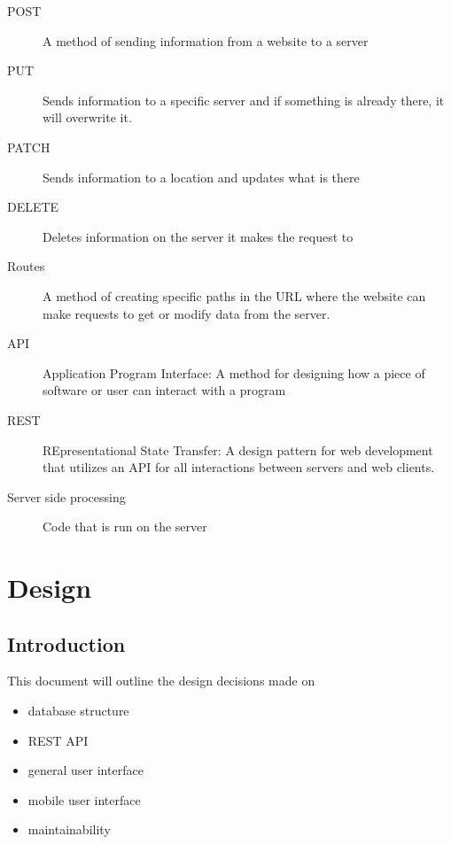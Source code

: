 \documentclass[draftclsnofoot,onecolumn,letterpaper,10pt]{IEEEtran}
\begin{document}
\begin{description}
		\item[POST] A method of sending information from a website to a server
		\item[PUT] Sends information to a specific server and if something is already there, it will overwrite it.
		\item[PATCH] Sends information to a location and updates what is there
		\item[DELETE] Deletes information on the server it makes the request to
		\item[Routes] A method of creating specific paths in the URL where the website can make requests to get or modify data from the server.
		\item[API] Application Program Interface: A method for designing how a piece of software or user can interact with a program
		\item[REST] REpresentational State Transfer: A design pattern for web development that utilizes an API for all interactions between servers and web clients.
		\item[Server side processing] Code that is run on the server
	\end{description}


\section{Design}
	\subsection{Introduction}
	This document will outline the design decisions made on
	\begin{itemize}
		\item database structure
		\item REST API
		\item general user interface
		\item mobile user interface
		\item maintainability
	\end{itemize}
\end{document}
